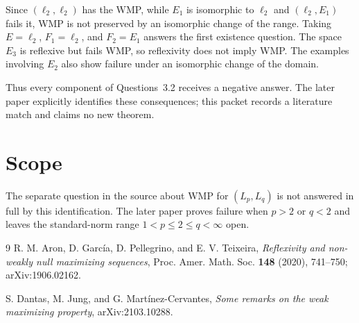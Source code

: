\documentclass[11pt]{article}
\begin{document}
Since $(\ell_2,\ell_2)$ has the WMP, while $E_1$ is isomorphic to $\ell_2$
and $(\ell_2,E_1)$ fails it, WMP is not preserved by an isomorphic change of
the range.  Taking $E=\ell_2$, $F_1=\ell_2$, and $F_2=E_1$ answers the first
existence question.  The space $E_3$ is reflexive but fails WMP, so
reflexivity does not imply WMP.  The examples involving $E_2$ also show
failure under an isomorphic change of the domain.

Thus every component of Questions~3.2 receives a negative answer.  The later
paper explicitly identifies these consequences; this packet records a
literature match and claims no new theorem.

\section{Scope}

The separate question in the source about WMP for $(L_p,L_q)$ is not answered
in full by this identification.  The later paper proves failure when $p>2$
or $q<2$ and leaves the standard-norm range $1<p\leq2\leq q<\infty$ open.

\begin{thebibliography}{9}
R. M. Aron, D. Garc\'ia, D. Pellegrino, and E. V. Teixeira,
\emph{Reflexivity and non-weakly null maximizing sequences},
Proc. Amer. Math. Soc. \textbf{148} (2020), 741--750;
arXiv:1906.02162.

S. Dantas, M. Jung, and G. Mart\'inez-Cervantes,
\emph{Some remarks on the weak maximizing property},
arXiv:2103.10288.
\end{thebibliography}
\end{document}
